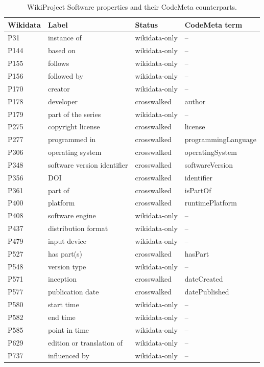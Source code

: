 \begin{longtable}{llll}
\caption{WikiProject Software properties and their CodeMeta counterparts.}\label{tab:wikiproject}\\
\hline
Wikidata & Label & Status & CodeMeta term \\ \hline \endhead
P31 & instance of & wikidata-only & -- \\
P144 & based on & wikidata-only & -- \\
P155 & follows & wikidata-only & -- \\
P156 & followed by & wikidata-only & -- \\
P170 & creator & wikidata-only & -- \\
P178 & developer & crosswalked & author \\
P179 & part of the series & wikidata-only & -- \\
P275 & copyright license & crosswalked & license \\
P277 & programmed in & crosswalked & programmingLanguage \\
P306 & operating system & crosswalked & operatingSystem \\
P348 & software version identifier & crosswalked & softwareVersion \\
P356 & DOI & crosswalked & identifier \\
P361 & part of & crosswalked & isPartOf \\
P400 & platform & crosswalked & runtimePlatform \\
P408 & software engine & wikidata-only & -- \\
P437 & distribution format & wikidata-only & -- \\
P479 & input device & wikidata-only & -- \\
P527 & has part(s) & crosswalked & hasPart \\
P548 & version type & wikidata-only & -- \\
P571 & inception & crosswalked & dateCreated \\
P577 & publication date & crosswalked & datePublished \\
P580 & start time & wikidata-only & -- \\
P582 & end time & wikidata-only & -- \\
P585 & point in time & wikidata-only & -- \\
P629 & edition or translation of & wikidata-only & -- \\
P737 & influenced by & wikidata-only & -- \\

\end{longtable}
